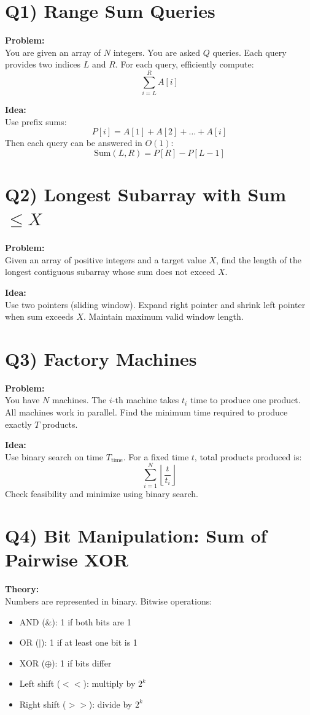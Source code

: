 \documentclass{article}
\begin{document}
\section*{Q1) Range Sum Queries}

\textbf{Problem:} \\
You are given an array of $N$ integers. You are asked $Q$ queries. Each query provides two indices $L$ and $R$. For each query, efficiently compute:
\[
\sum_{i=L}^{R} A[i]
\]

\textbf{Idea:} \\
Use prefix sums:
\[
P[i] = A[1] + A[2] + \dots + A[i]
\]
Then each query can be answered in $O(1)$:
\[
\text{Sum}(L,R) = P[R] - P[L-1]
\]

\section*{Q2) Longest Subarray with Sum $\leq X$}

\textbf{Problem:} \\
Given an array of positive integers and a target value $X$, find the length of the longest contiguous subarray whose sum does not exceed $X$.

\textbf{Idea:} \\
Use two pointers (sliding window). Expand right pointer and shrink left pointer when sum exceeds $X$. Maintain maximum valid window length.

\section*{Q3) Factory Machines}

\textbf{Problem:} \\
You have $N$ machines. The $i$-th machine takes $t_i$ time to produce one product. All machines work in parallel. Find the minimum time required to produce exactly $T$ products.

\textbf{Idea:} \\
Use binary search on time $T_{\text{time}}$. For a fixed time $t$, total products produced is:
\[
\sum_{i=1}^{N} \left\lfloor \frac{t}{t_i} \right\rfloor
\]
Check feasibility and minimize using binary search.

\section*{Q4) Bit Manipulation: Sum of Pairwise XOR}

\textbf{Theory:} \\
Numbers are represented in binary. Bitwise operations:
\begin{itemize}
    \item AND ($\&$): 1 if both bits are 1
    \item OR ($|$): 1 if at least one bit is 1
    \item XOR ($\oplus$): 1 if bits differ
    \item Left shift ($<<$): multiply by $2^k$
    \item Right shift ($>>$): divide by $2^k$
\end{itemize}
\end{document}
